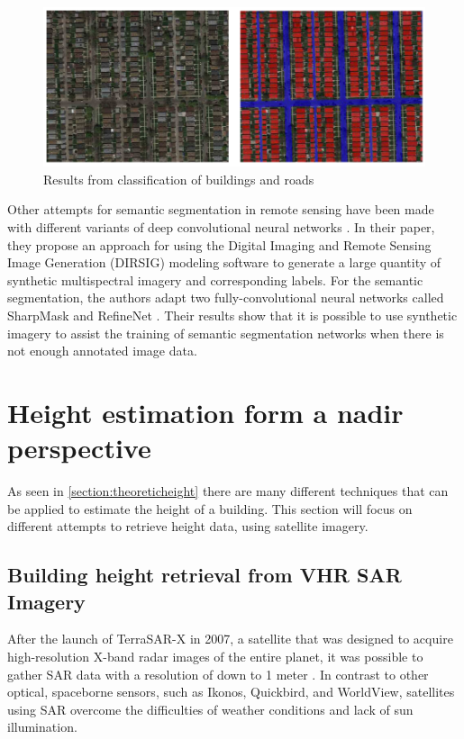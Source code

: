 \begin{figure}[!h]
	\centering
	\includegraphics[scale=0.4]{fig/aerial_segmentation.png}
	\caption{Results from classification of buildings and roads \citep{Kaiser2017}}
	\label{fig:aerialsegmentation}
\end{figure}

Other attempts for semantic segmentation in remote sensing have been made with different variants of deep convolutional neural networks \citep{Kemker2017}. In their paper, they propose an approach for using the Digital Imaging and Remote Sensing Image Generation (DIRSIG) modeling software to generate a large quantity of synthetic multispectral imagery and corresponding labels. For the semantic segmentation, the authors adapt two fully-convolutional neural networks called SharpMask \citep{Pinheiro2016} and RefineNet \citep{Lin2016}. Their results show that it is possible to use synthetic imagery to assist the training of semantic segmentation networks when there is not enough annotated image data.

\section{Height estimation form a nadir perspective}
As seen in \autoref{section:theoreticheight} there are many different techniques that can be applied to estimate the height of a building. This section will focus on different attempts to retrieve height data, using satellite imagery.

\subsection{Building height retrieval from VHR SAR Imagery}
After the launch of TerraSAR-X in 2007, a satellite that was designed to acquire high-resolution X-band radar images of the entire planet, it was possible to gather SAR data with a resolution of down to 1 meter \citep{Airbus2017}. In contrast to other optical, spaceborne sensors, such as Ikonos, Quickbird, and WorldView, satellites using SAR overcome the difficulties of weather conditions and lack of sun illumination.

